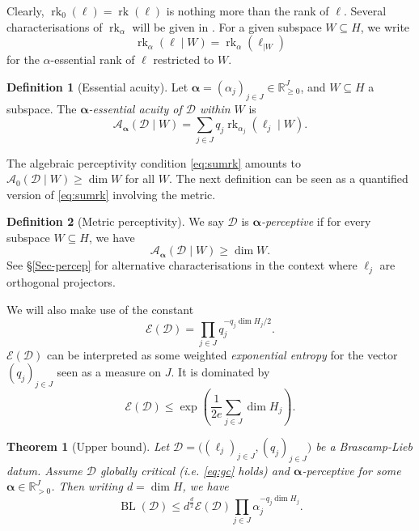 \documentclass[a4paper,english]{amsart}
\newtheorem{thm}{Theorem}[section]
\theoremstyle{definition}
\newtheorem*{definition}{Definition}
\newcommand{\R}{\mathbb{R}}
\newcommand{\bba}{\boldsymbol{\alpha}}
\newcommand{\1}{\mathbbm{1}}
\newcommand{\sD} {{\mathscr D}}
\newcommand{\sE}{\mathscr{E}}
\newcommand{\sA}{\mathscr{A}}
\DeclareMathOperator{\rk}{rk}
\DeclareMathOperator{\BL}{BL}
\begin{document}
Clearly, $\rk_0(\ell) = \rk(\ell)$ is nothing more than the rank of $\ell$.
Several characterisations of $\rk_{\alpha}$ will be given in .
For a given subspace $W \subseteq H$, we write
\[
\rk_\alpha(\ell \mid W) = \rk_\alpha( \ell_{\mid W})
\]
for the $\alpha$-essential rank of $\ell$ restricted to $W$.

\begin{definition}[Essential acuity] \label{def-acuity}
Let $\bba=(\alpha_{j})_{j\in J} \in \R_{\geq 0}^J$, and $W\subseteq H$ a subspace. The \emph{$\bba$-essential acuity of $\sD$ within $W$} is
$$\sA_{\bba}(\sD \mid W) = \sum_{j\in J} q_{j} \rk_{\alpha_{j}}(\ell_{j} \mid W).$$
\end{definition}

The algebraic perceptivity condition \eqref{eq:sumrk} amounts to $\sA_{0}(\sD \mid W)  \geq \dim W$ for all $W$. The next definition can be seen as a quantified  version of \eqref{eq:sumrk} involving the metric.

\begin{definition}[Metric perceptivity]
We say $\sD$ is \emph{$\bba$-perceptive}  if for every subspace $W\subseteq H$, we have
\begin{equation}\label{def-alpha-percep}
\sA_{\bba}(\sD \mid W)  \geq \dim W.
\end{equation}
See \S\ref{Sec-percep} for alternative characterisations in the context where $\ell_{j}$ are orthogonal projectors.
\end{definition}

We will also make use of the constant
\begin{equation}\label{eq:sE} \sE(\sD)=\prod_{j\in J}q_{j}^{-q_{j}\dim H_{j}/2}.
\end{equation}
$ \sE(\sD)$ can be interpreted as some weighted \emph{exponential entropy} for the vector $(q_{j})_{j\in J}$ seen as a measure on $J$.
It is dominated by \[
\sE(\sD) \leq \exp\left( {\textstyle\frac{1}{2 e} \sum_{j \in J} \dim H_j}\right).
\]


\begin{thm}[Upper bound] \label{thm:ub}
Let $\sD = \bigl((\ell_j)_{j \in J}, (q_j)_{j \in J}\bigr)$ be a Brascamp-Lieb datum. Assume $\sD$ globally critical (i.e. \eqref{eq:gc} holds) and $\bba$-perceptive for some $\bba\in \R_{> 0}^J$. Then writing $d=\dim H$, we have
\[
\BL(\sD) \leq d^{\frac{d}{2}} \sE(\sD) \prod_{j \in J} \alpha_j^{- q_j \dim H_j}.
\]
\end{thm}
\end{document}
